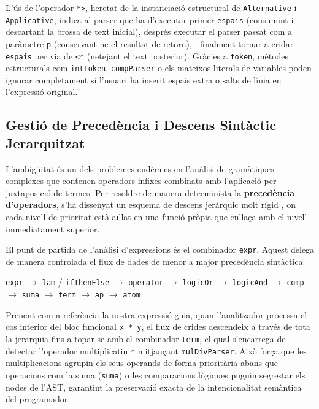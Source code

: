 L'ús de l'operador \texttt{*>}, heretat de la instanciació estructural de \texttt{Alternative} i \texttt{Applicative}, indica al parser que ha d'executar primer \texttt{espais} (consumint i descartant la brossa de text inicial), després executar el parser passat com a paràmetre \texttt{p} (conservant-ne el resultat de retorn), i finalment tornar a cridar \texttt{espais} per via de \texttt{<*} (netejant el text posterior). Gràcies a \texttt{token}, mètodes estructurals com \texttt{intToken}, \texttt{compParser} o els mateixos literals de variables poden ignorar completament si l'usuari ha inserit espais extra o salts de línia en l'expressió original.

\subsection{Gestió de Precedència i Descens Sintàctic Jerarquitzat}
L'ambigüitat és un dels problemes endèmics en l'anàlisi de gramàtiques complexes que contenen operadors infixes combinats amb l'aplicació per juxtaposició de termes. Per resoldre de manera determinista la \textbf{precedència d'operadors}, s'ha dissenyat un esquema de descens jeràrquic molt rígid \cite{peyton1987implementation}, on cada nivell de prioritat està aïllat en una funció pròpia que enllaça amb el nivell immediatament superior.

El punt de partida de l'anàlisi d'expressions és el combinador \texttt{expr}. Aquest delega de manera controlada el flux de dades de menor a major precedència sintàctica:

\begin{center}
\texttt{expr} $\rightarrow$ \texttt{lam} / \texttt{ifThenElse} $\rightarrow$ \texttt{operator} $\rightarrow$ \texttt{logicOr} $\rightarrow$ \texttt{logicAnd} $\rightarrow$ \texttt{comp} $\rightarrow$ \texttt{suma} $\rightarrow$ \texttt{term} $\rightarrow$ \texttt{ap} $\rightarrow$ \texttt{atom}
\end{center}

Prenent com a referència la nostra expressió guia, quan l'analitzador processa el cos interior del bloc funcional \texttt{x * y}, el flux de crides descendeix a través de tota la jerarquia fins a topar-se amb el combinador \texttt{term}, el qual s'encarrega de detectar l'operador multiplicatiu \texttt{*} mitjançant \texttt{mulDivParser}. Això força que les multiplicacions agrupin els seus operands de forma prioritària abans que operacions com la suma (\texttt{suma}) o les comparacions lògiques puguin segrestar els nodes de l'AST, garantint la preservació exacta de la intencionalitat semàntica del programador.

